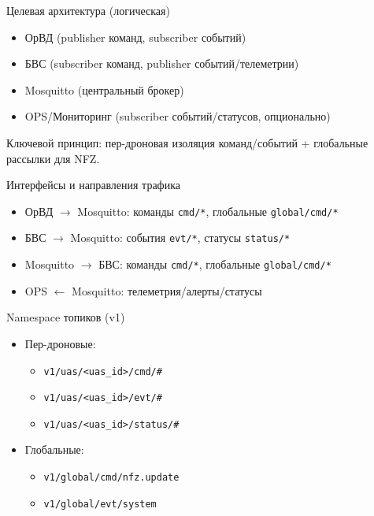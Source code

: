 \documentclass[aspectratio=169]{beamer}
\begin{document}
\begin{frame}{Целевая архитектура (логическая)}
\begin{itemize}
  \item ОрВД (publisher команд, subscriber событий)
  \item БВС (subscriber команд, publisher событий/телеметрии)
  \item Mosquitto (центральный брокер)
  \item OPS/Мониторинг (subscriber событий/статусов, опционально)
\end{itemize}
\vspace{1em}
Ключевой принцип: пер-дроновая изоляция команд/событий + глобальные рассылки для NFZ.
\end{frame}

\begin{frame}{Интерфейсы и направления трафика}
\begin{itemize}
  \item ОрВД $\rightarrow$ Mosquitto: команды \texttt{cmd/*}, глобальные \texttt{global/cmd/*}
  \item БВС $\rightarrow$ Mosquitto: события \texttt{evt/*}, статусы \texttt{status/*}
  \item Mosquitto $\rightarrow$ БВС: команды \texttt{cmd/*}, глобальные \texttt{global/cmd/*}
  \item OPS $\leftarrow$ Mosquitto: телеметрия/алерты/статусы
\end{itemize}
\end{frame}

\begin{frame}{Namespace топиков (v1)}
\begin{itemize}
  \item Пер-дроновые:
  \begin{itemize}
    \item \texttt{v1/uas/<uas\_id>/cmd/\#}
    \item \texttt{v1/uas/<uas\_id>/evt/\#}
    \item \texttt{v1/uas/<uas\_id>/status/\#}
  \end{itemize}
  \item Глобальные:
  \begin{itemize}
    \item \texttt{v1/global/cmd/nfz.update}
    \item \texttt{v1/global/evt/system}
  \end{itemize}
\end{itemize}
\end{frame}
\end{document}
